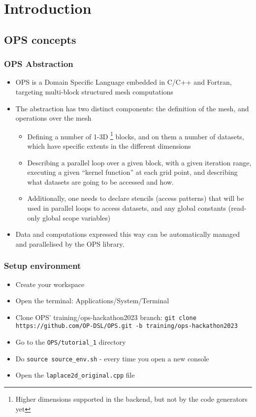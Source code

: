 \documentclass{beamer}
\begin{document}
\section{Introduction} %

\subsection{OPS concepts} 

\begin{frame}
\frametitle{OPS Abstraction}
\begin{itemize}
\item
OPS is a Domain Specific Language embedded in C/C++ and Fortran, targeting multi-block structured mesh computations

\item The abstraction has two distinct components: the definition of the mesh, and operations over the mesh
\begin{itemize}
\item Defining a number of 1-3D \footnote{Higher dimensions supported in the backend, but not by the code generators yet} blocks, and on them a number of datasets, which have specific extents in the different dimensions
\item Describing a parallel loop over a given block, with a given iteration range, executing a given ``kernel function'' at each grid point, and describing what datasets are going to be accessed and how.
\item Additionally, one needs to declare stencils (access patterns) that will be used in parallel loops to access datasets, and any global constants (read-only global scope variables)
\end{itemize}
\item Data and computations expressed this way can be automatically managed and parallelised by the OPS library.
\end{itemize}

\end{frame}

\begin{frame}
\frametitle{Setup environment}
\begin{itemize}
\item Create your workspace
\item Open the terminal: Applications/System/Terminal
\item Clone OPS' training/ops-hackathon2023 branch: \texttt{git clone https://github.com/OP-DSL/OPS.git -b training/ops-hackathon2023}
\item Go to the \texttt{OPS/tutorial\_1} directory
\item Do \texttt{source source\_env.sh} - every time you open a new console
\item Open the \texttt{laplace2d\_original.cpp} file
\end{itemize}
\end{frame}
\end{document}
